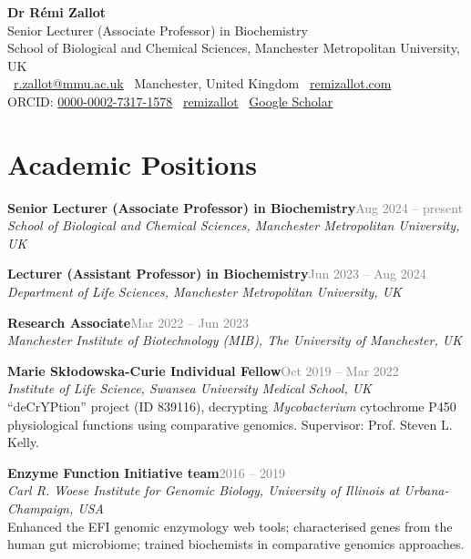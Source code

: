 \documentclass[10pt,a4paper]{article}
\newcommand{\cvdate}[1]{\textcolor{graytext}{\small #1}}
\newcommand{\cventry}[4]{%
  \noindent\textbf{#1}\hfill\cvdate{#2}\\
  \textit{#3}\\
  #4\par\vspace{0.4em}
}
\begin{document}
\begin{center}
  {\Huge\bfseries Dr Rémi Zallot}\\[0.35em]
  {\large Senior Lecturer (Associate Professor) in Biochemistry}\\[0.15em]
  {\large School of Biological and Chemical Sciences, Manchester Metropolitan University, UK}\\[0.6em]
  \small
  \faEnvelope\ \href{mailto:r.zallot@mmu.ac.uk}{r.zallot@mmu.ac.uk} \quad\textbullet\quad
  \faMapMarker*\ Manchester, United Kingdom \quad\textbullet\quad
  \faGlobe\ \href{https://remizallot.com}{remizallot.com}\\[0.25em]
  ORCID: \href{https://orcid.org/0000-0002-7317-1578}{0000-0002-7317-1578} \quad\textbullet\quad
  \faGithubSquare\ \href{https://github.com/remizallot}{remizallot} \quad\textbullet\quad
  \faGraduationCap\ \href{https://scholar.google.com/citations?user=sMUlExUAAAAJ}{Google Scholar}
\end{center}

\section*{Academic Positions}

\cventry{Senior Lecturer (Associate Professor) in Biochemistry}{Aug 2024 -- present}
  {School of Biological and Chemical Sciences, Manchester Metropolitan University, UK}{}

\cventry{Lecturer (Assistant Professor) in Biochemistry}{Jun 2023 -- Aug 2024}
  {Department of Life Sciences, Manchester Metropolitan University, UK}{}

\cventry{Research Associate}{Mar 2022 -- Jun 2023}
  {Manchester Institute of Biotechnology (MIB), The University of Manchester, UK}{}

\cventry{Marie Skłodowska-Curie Individual Fellow}{Oct 2019 -- Mar 2022}
  {Institute of Life Science, Swansea University Medical School, UK}
  {``deCrYPtion'' project (ID 839116), decrypting \textit{Mycobacterium} cytochrome P450 physiological functions using comparative genomics. Supervisor: Prof. Steven L. Kelly.}

\cventry{Enzyme Function Initiative team}{2016 -- 2019}
  {Carl R. Woese Institute for Genomic Biology, University of Illinois at Urbana-Champaign, USA}
  {Enhanced the EFI genomic enzymology web tools; characterised genes from the human gut microbiome; trained biochemists in comparative genomics approaches.}
\end{document}
